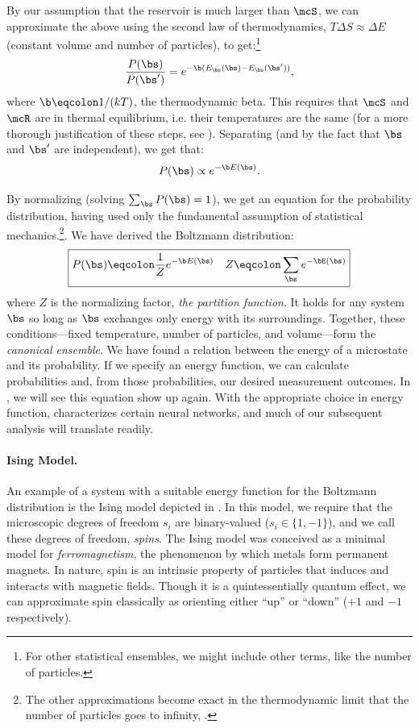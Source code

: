 By our assumption that the reservoir is much larger than $\mcS$, we can
approximate the above using the second law of thermodynamics,
$T \Delta S \approx \Delta E$ (constant volume and number of
particles), to get:\footnote{For other statistical ensembles, we might
  include other terms, like the number of particles.}
\begin{equation}%
  \frac{P(\bs)}{P(\bs')}=e^{-\b(E_{\bs}(\bs)-E_{\bs}(\bs'))},\label{eq:boltzmann-energy-difference}
\end{equation}%
where $\b\eqcolon 1/(kT)$, the thermodynamic beta. This requires that
$\mcS$ and $\mcR$ are in thermal equilibrium, i.e.  their temperatures
are the same (for a more thorough justification of these steps, see
). Separating (and by the fact that $\bs$
and $\bs'$ are independent), we get that:%
\begin{equation}%
  P(\bs)\propto e^{-\b E(\bs)}.
\end{equation}%

By normalizing (solving $\sum_{\bs } P(\bs)=1$), we get an equation
for the probability distribution, having used only the fundamental
assumption of statistical mechanics.\footnote{The other approximations
  become exact in the thermodynamic limit that the number of particles
  goes to infinity, .}. We have derived the
Boltzmann distribution:%
\begin{equation}%
  \boxed{P(\bs)\eqcolon\frac{1}{Z}e^{-\b E(\bs)}\quad Z\eqcolon\sum_{\bs} e^{-\bE(\bs)}}\label{eq:boltzmann-distribution}
\end{equation}%
where $Z$ is the normalizing factor, \textit{the partition
  function}. It holds for any system $\bs$ so long as $\bs$ exchanges
only energy with its surroundings. Together, these conditions---fixed
temperature, number of particles, and volume---form the
\textit{canonical ensemble}. We have found a relation between the
energy of a microstate and its probability. If we specify an energy
function, we can calculate probabilities and, from those
probabilities, our desired measurement outcomes. In
, we will see this equation show up again. With
the appropriate choice in energy function,
 characterizes certain neural
networks, and much of our subsequent analysis will translate readily.

\paragraph{Ising Model.}
An example of a system with a suitable energy function for the
Boltzmann distribution is the Ising model depicted in
. In this model, we require that the microscopic
degrees of freedom $s_i$ are binary-valued ($s_i \in \{1,-1\}$), and
we call these degrees of freedom, \textit{spins}. The Ising model was
conceived as a minimal model for \textit{ferromagnetism}, the
phenomenon by which metals form permanent magnets. In nature, spin is
an intrinsic property of particles that induces and interacts with
magnetic fields. Though it is a quintessentially quantum effect, we
can approximate spin classically as orienting either ``up'' or
``down'' ($+1$ and $-1$ respectively).

